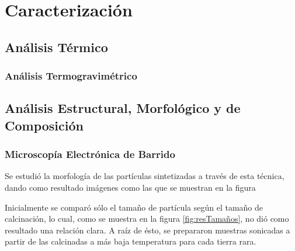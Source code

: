 \documentclass[../main.tex]{subfiles}
\begin{document}
\section{Caracterización}
\subsection{Análisis Térmico} \label{sec:analisistermico}
\subsubsection{Análisis Termogravimétrico} \label{sec:TGA}

\subsection{Análisis Estructural, Morfológico y de Composición} \label{sec:analisisestruc}

\subsubsection{Microscopía Electrónica de Barrido}
Se estudió la morfología de las partículas sintetizadas a través de esta técnica, dando como resultado imágenes como las que se muestran en la figura %

Inicialmente se comparó sólo el tamaño de partícula según el tamaño de calcinación, lo cual, como se muestra en la figura \ref{fig:resTamaños}, no dió como resultado una relación clara. A raíz de ésto, se prepararon muestras sonicadas a partir de las calcinadas a más baja temperatura para cada tierra rara.
\end{document}
